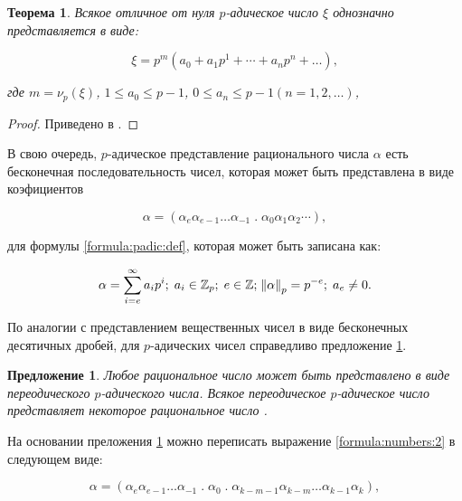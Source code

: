 \documentclass[master, och, diploma, times]{sty/SCWorks}
\theoremstyle{plain}
\newtheorem{thethm}{Теорема}[section]
\newtheorem{proposition}{Предложение}[section]
\theoremstyle{definition}
\numberwithin{equation}{section}
\begin{document}
\begin{thethm}\label{th:numbers:representation}
Всякое отличное от нуля $p$-адическое число $\xi$ однозначно представляется в виде:

\begin{equation}
\xi=p^m(a_0+a_1p^1+\cdots+a_np^n+\dots),
\end{equation}

\noindent где $m=\nu_p(\xi)$, $1 \le a_0 \le p-1$, $0 \le a_n \le p-1$$(n=1,2,\dots)$,
\end{thethm}

\begin{proof}
Приведено в \cite{bib:number:borevich}.
\end{proof}


В свою очередь, $p$-адическое представление рационального числа $\alpha$ есть бесконечная последовательность чисел, которая может быть представлена в виде коэфициентов

\begin{equation}\label{formula:numbers:2}
\alpha=(\alpha_{e}\alpha_{e-1}\dots\alpha_{-1} \; . \; \alpha_0\alpha_1\alpha_2\cdots),
\end{equation}

\noindent для формулы \ref{formula:padic:def}, которая может быть записана как:

\begin{equation}
\alpha=\sum\limits_{i=e}^{\infty} a_ip^i; \; a_i \in \mathbb{Z}_p; \; e \in \mathbb{Z}; \; \norm{\alpha}_p=p^{-e}; \; a_e \neq 0.
\end{equation}

По аналогии с представлением вещественных чисел в виде бесконечных десятичных дробей, для $p$-адических чисел справедливо предложение \ref{pros:numbers:1}.

\begin{proposition}\label{pros:numbers:1}
Любое рациональное число может быть представлено в виде переодического $p$-адического числа. Всякое переодическое $p$-адическое число представляет некоторое рациональное число \cite{bib:analysis:kobliz}.
\end{proposition}

На основании преложения \ref{pros:numbers:1} можно переписать выражение \ref{formula:numbers:2} в следующем виде:

\begin{equation}\label{formula:numbers:3}
\alpha=(\alpha_{e}\alpha_{e-1}\dots\alpha_{-1} \; . \; \alpha_0\;.\;\alpha_{k-m-1}\alpha_{k-m}\dots\alpha_{k-1}\alpha_{k}),
\end{equation}
\end{document}
